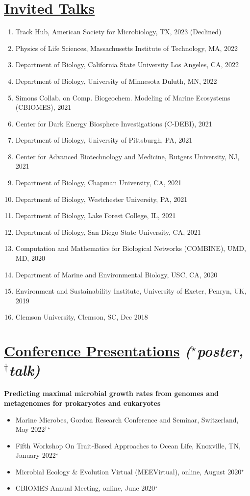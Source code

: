 \documentclass[]{res}
\begin{document}
\begin{resume}
   \section{\underline{Invited Talks}} \vspace{2mm}
    \begin{enumerate}[leftmargin=*]
\item Track Hub, American Society for Microbiology, TX, 2023 (Declined)
\item Physics of Life Sciences, Massachusetts Institute of Technology, MA, 2022
\item Department of Biology, California State University Los Angeles, CA, 2022
\item Department of Biology, University of Minnesota Duluth, MN, 2022
\item Simons Collab. on Comp. Biogeochem. Modeling of Marine Ecosystems (CBIOMES), 2021
\item Center for Dark Energy Biosphere Investigations (C-DEBI), 2021
\item Department of Biology, University of Pittsburgh, PA, 2021
\item Center for Advanced Biotechnology and Medicine, Rutgers University, NJ, 2021
\item Department of Biology, Chapman University, CA, 2021
\item Department of Biology, Westchester University, PA, 2021
\item Department of Biology, Lake Forest College, IL, 2021
\item Department of Biology, San Diego State University, CA, 2021
\item Computation and Mathematics for Biological Networks (COMBINE), UMD, MD, 2020
\item Department of Marine and Environmental Biology, USC, CA, 2020
\item Environment and Sustainability Institute, University of Exeter, Penryn, UK, 2019
\item Clemson University, Clemson, SC, Dec 2018
\end{enumerate}

 \section{\underline{Conference Presentations} \emph{{($^{\star}$poster, $^{\dagger}$talk)}}} \vspace{2mm}
 
 {\bf Predicting maximal microbial growth rates from genomes and metagenomes for prokaryotes and eukaryotes}
 \begin{itemize}
 \item Marine Microbes, Gordon Research Conference and Seminar, Switzerland, May 2022$^{\dagger\star}$
 \item Fifth Workshop On Trait-Based Approaches to Ocean Life, Knoxville, TN, January 2022$^{\star}$
 \item Microbial Ecology \& Evolution Virtual (MEEVirtual), online, August 2020$^{\star}$
 \item CBIOMES Annual Meeting, online, June 2020$^{\star}$
 \end{itemize}
 

\end{resume}
\end{document}
